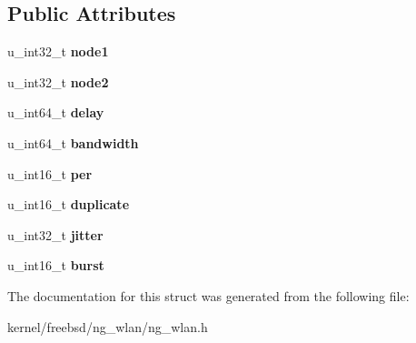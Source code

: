 \subsection*{Public Attributes}
\begin{DoxyCompactItemize}
\item 
\hypertarget{structng__wlan__set__data_a0d40e7966c7f6aa9d54789a412243b0c}{u\+\_\+int32\+\_\+t {\bfseries node1}}\label{structng__wlan__set__data_a0d40e7966c7f6aa9d54789a412243b0c}

\item 
\hypertarget{structng__wlan__set__data_aa478b3a93163303dfb40d8ef7ca9aba5}{u\+\_\+int32\+\_\+t {\bfseries node2}}\label{structng__wlan__set__data_aa478b3a93163303dfb40d8ef7ca9aba5}

\item 
\hypertarget{structng__wlan__set__data_a0149c06e55b45970debc99738f761975}{u\+\_\+int64\+\_\+t {\bfseries delay}}\label{structng__wlan__set__data_a0149c06e55b45970debc99738f761975}

\item 
\hypertarget{structng__wlan__set__data_a16b16afb1d4ff4bfcce0176ac1b15b45}{u\+\_\+int64\+\_\+t {\bfseries bandwidth}}\label{structng__wlan__set__data_a16b16afb1d4ff4bfcce0176ac1b15b45}

\item 
\hypertarget{structng__wlan__set__data_a54f0929f28b34c6edc39d04bc5352991}{u\+\_\+int16\+\_\+t {\bfseries per}}\label{structng__wlan__set__data_a54f0929f28b34c6edc39d04bc5352991}

\item 
\hypertarget{structng__wlan__set__data_a050cf48c947b4f97b3df1391aa7a8988}{u\+\_\+int16\+\_\+t {\bfseries duplicate}}\label{structng__wlan__set__data_a050cf48c947b4f97b3df1391aa7a8988}

\item 
\hypertarget{structng__wlan__set__data_ab3e224bbdb2b777e65c73ce566cdaed8}{u\+\_\+int32\+\_\+t {\bfseries jitter}}\label{structng__wlan__set__data_ab3e224bbdb2b777e65c73ce566cdaed8}

\item 
\hypertarget{structng__wlan__set__data_acb873e81432dab33936e85a83fa24c01}{u\+\_\+int16\+\_\+t {\bfseries burst}}\label{structng__wlan__set__data_acb873e81432dab33936e85a83fa24c01}

\end{DoxyCompactItemize}


The documentation for this struct was generated from the following file\+:\begin{DoxyCompactItemize}
\item 
kernel/freebsd/ng\+\_\+wlan/ng\+\_\+wlan.\+h\end{DoxyCompactItemize}
